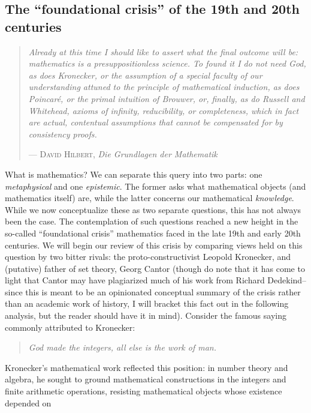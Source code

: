 \documentclass{article}
\begin{document}
\subsection{The ``foundational crisis'' of the 19th and 20th centuries}
\begin{quote}
     \textit{Already at this time I should like to assert what the final outcome will be: mathematics is a presuppositionless 
     science. To found it I do not need God, as does Kronecker, or the assumption of a special faculty of our understanding 
     attuned to the principle of mathematical induction, as does Poincaré, or the primal intuition of Brouwer, or, finally, 
     as do Russell and Whitehead, axioms of infinity, reducibility, or completeness, which in fact are actual, contentual
     assumptions that cannot be compensated for by consistency proofs.}
     \par\medskip
    \hfill --- \textsc{David Hilbert}, \textit{Die Grundlagen der Mathematik} \textit{\parencite{hilbert1928,hilbert1967}}
\end{quote}
What is mathematics? We can separate this query into two parts: one \textit{metaphysical} and one \textit{epistemic}. 
The former asks what mathematical objects (and mathematics itself) are, while the latter concerns our mathematical 
\textit{knowledge}. While we now conceptualize these as two separate questions, this has not always been the case. 
The contemplation of such questions reached a new height in the so-called ``foundational crisis'' mathematics faced in the 
late 19th and early 20th centuries. We will begin our review of this crisis by comparing views held on this question by two 
bitter rivals: the proto-constructivist Leopold Kronecker, and (putative) father of set theory, Georg Cantor (though do note that it has 
come to light that Cantor may have plagiarized much of his work from Richard Dedekind--since this is meant to be an opinionated 
conceptual summary of the crisis rather than an academic work of history, I will bracket this fact out in the following analysis, but the reader should 
have it in mind).
Consider the famous saying commonly attributed to Kronecker:
\begin{quote}
    \textit{God made the integers, all else is the work of man.} \textit{\parencite[p.~19]{weber1893}}
\end{quote}
Kronecker's mathematical work reflected this position: in number theory and algebra, he sought to ground mathematical 
constructions in the integers and finite arithmetic operations, resisting mathematical objects whose existence depended on 
\end{document}
